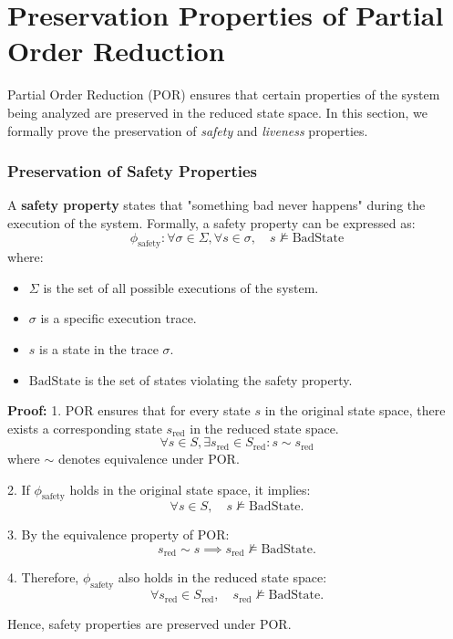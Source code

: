 \chapter{Preservation Properties of Partial Order Reduction}

Partial Order Reduction (POR) ensures that certain properties of the system being analyzed are preserved in the reduced state space. In this section, we formally prove the preservation of \textit{safety} and \textit{liveness} properties.

\subsection{Preservation of Safety Properties}

A \textbf{safety property} states that "something bad never happens" during the execution of the system. Formally, a safety property can be expressed as:
\[
\phi_{\text{safety}}: \forall \sigma \in \Sigma, \forall s \in \sigma, \quad s \not\models \text{BadState}
\]
where:
\begin{itemize}
    \item \( \Sigma \) is the set of all possible executions of the system.
    \item \( \sigma \) is a specific execution trace.
    \item \( s \) is a state in the trace \( \sigma \).
    \item \( \text{BadState} \) is the set of states violating the safety property.
\end{itemize}

\textbf{Proof:}
1. POR ensures that for every state \( s \) in the original state space, there exists a corresponding state \( s_{\text{red}} \) in the reduced state space.
\[
\forall s \in S, \exists s_{\text{red}} \in S_{\text{red}}: s \sim s_{\text{red}}
\]
where \( \sim \) denotes equivalence under POR.

2. If \( \phi_{\text{safety}} \) holds in the original state space, it implies:
\[
\forall s \in S, \quad s \not\models \text{BadState}.
\]

3. By the equivalence property of POR:
\[
s_{\text{red}} \sim s \implies s_{\text{red}} \not\models \text{BadState}.
\]

4. Therefore, \( \phi_{\text{safety}} \) also holds in the reduced state space:
\[
\forall s_{\text{red}} \in S_{\text{red}}, \quad s_{\text{red}} \not\models \text{BadState}.
\]

Hence, safety properties are preserved under POR.

